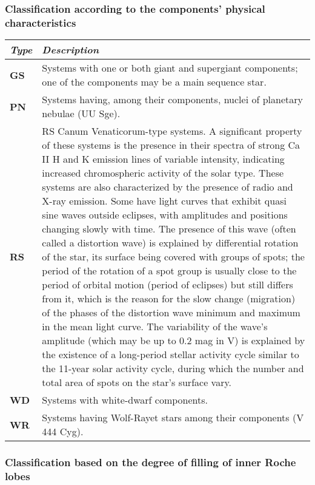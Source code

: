 \subsubsection{Classification according to the components' physical
characteristics}\label{classification-according-to-the-components-physical-characteristics}

\begin{longtabu} to \textwidth {l|X}
\toprule
\emph{Type} & \emph{Description}\tabularnewline
\midrule
\textbf{GS} & Systems with one or both giant and supergiant components;
one of the components may be a main sequence star.\tabularnewline
\midrule
\textbf{PN} & Systems having, among their components, nuclei of
planetary nebulae (UU Sge).\tabularnewline
\midrule
\textbf{RS} & RS Canum Venaticorum-type systems. A significant property
of these systems is the presence in their spectra of strong Ca II H and
K emission lines of variable intensity, indicating increased
chromospheric activity of the solar type. These systems are also
characterized by the presence of radio and X-ray emission. Some have
light curves that exhibit quasi sine waves outside eclipses, with
amplitudes and positions changing slowly with time. The presence of this
wave (often called a distortion wave) is explained by differential
rotation of the star, its surface being covered with groups of spots;
the period of the rotation of a spot group is usually close to the
period of orbital motion (period of eclipses) but still differs from it,
which is the reason for the slow change (migration) of the phases of the
distortion wave minimum and maximum in the mean light curve. The
variability of the wave's amplitude (which may be up to 0.2 mag in V) is
explained by the existence of a long-period stellar activity cycle
similar to the 11-year solar activity cycle, during which the number and
total area of spots on the star's surface vary.\tabularnewline
\midrule
\textbf{WD} & Systems with white-dwarf components.\tabularnewline
\midrule
\textbf{WR} & Systems having Wolf-Rayet stars among their components (V
444 Cyg).\tabularnewline
\bottomrule
\end{longtabu}

\subsubsection{Classification based on the degree of filling of inner Roche
lobes}\label{classification-based-on-the-degree-of-filling-of-inner-roche-lobes}


